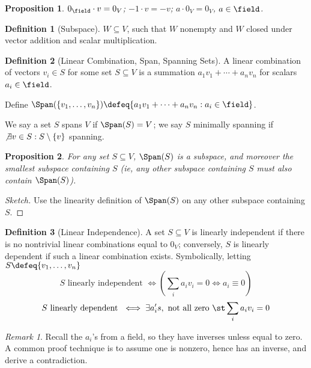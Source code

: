 \documentclass[12pt, oneside]{article}
\theoremstyle{definition}
\newtheorem{defn}{Definition}
\theoremstyle{plain}
\newtheorem{prop}{Proposition}
\theoremstyle{remark}
\newtheorem{remark}{Remark}
\begin{document}
\begin{prop}
  $0_\field \cdot v = 0_V$; $-1 \cdot v = -v$; $a\cdot 0_V = 0_V$, $a\in \field$.
\end{prop}

\begin{defn}[Subspace]
  $W \subseteq V$, such that $W$ nonempty and $W$ closed under vector addition and scalar multiplication.
\end{defn}


\begin{defn}[Linear Combination, Span, Spanning Sets]
  A linear combination of vectors $v_i \in S$ for some set $S \subseteq V$ is a summation $a_1 v_1 + \cdots + a_n v_n$ for scalars $a_i \in \field$.

  Define $\Span(\{v_1, \dots, v_n\}) \defeq \{a_1 v_1 + \cdots + a_n v_n : a_i \in \field\}$.

  We say a set $S$ spans $V$ if $\Span(S) = V$; we say $S$ minimally spanning if $\not\exists v \in S : S\setminus \{v\}$ spanning. 
\end{defn}

\begin{prop}
  For any set $S \subseteq V$, $\Span(S)$ is a subspace, and moreover the smallest subspace containing $S$ (ie, any other subspace containing $S$ must also contain $\Span(S)$).
\end{prop}

\begin{proof}[Sketch]
  Use the linearity definition of $\Span(S)$ on any other subspace containing $S$.
\end{proof}

\begin{defn}[Linear Independence]
  A set $S \subseteq V$ is linearly independent if there is no nontrivial linear combinations equal to $0_V$; conversely, $S$ is linearly dependent if such a linear combination exists. Symbolically, letting $S \defeq \{v_1, \dots, v_n\}$ \[
  S\text{ linearly independent } \iff (\sum_i a_i v_i = 0 \iff a_i \equiv 0)\]\[
  S \text{ linearly dependent } \iff \exists a_i's, \text{ not all zero }\st \sum_i a_i v_i = 0
  \]
\end{defn}

\begin{remark}
Recall the $a_i$'s from a field, so they have inverses unless equal to zero. A common proof technique is to assume one is nonzero, hence has an inverse, and derive a contradiction.  
\end{remark}
\end{document}
